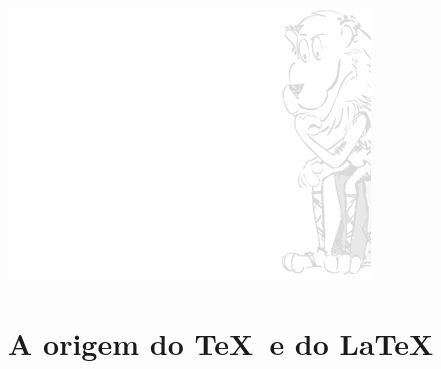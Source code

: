 \documentclass[handout]{beamer}
\begin{document}
		{\includegraphics[width=\paperwidth,height=\paperheight,keepaspectratio=false]{leao-pensador-wattermark.png}}

\logo{} %

\section[Origem]{A origem do \TeX\ e do \LaTeX}
\end{document}
